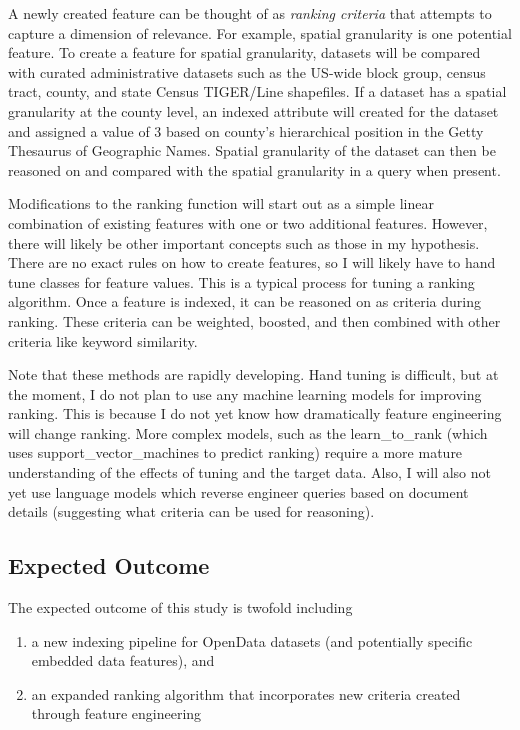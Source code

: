 A newly created feature can be thought of as \emph{ranking criteria} that attempts to capture a dimension of relevance. For example, spatial granularity is one potential feature. To create a feature for spatial granularity, datasets will be compared with curated administrative datasets such as the US-wide block group, census tract, county, and state Census TIGER/Line shapefiles. If a dataset has a spatial granularity at the county level, an indexed attribute will created for the dataset and assigned a value of 3 based on county's hierarchical position in the Getty Thesaurus of Geographic Names. Spatial granularity of the dataset can then be reasoned on and compared with the spatial granularity in a query when present.


Modifications to the ranking function will start out as a simple linear combination of existing features with one or two additional features. However, there will likely be other important concepts such as those in my hypothesis. There are no exact rules on how to create features, so I will likely have to hand tune classes for feature values. This is a typical process for tuning a ranking algorithm. Once a feature is indexed, it can be reasoned on as criteria during ranking. These criteria can be weighted, boosted, and then combined with other criteria like keyword similarity.

Note that these methods are rapidly developing. Hand tuning is difficult, but at the moment, I do not plan to use any machine learning models for improving ranking. This is because I do not yet know how dramatically feature engineering will change ranking. More complex models, such as the \gls{learn_to_rank} (which uses \gls{support_vector_machines} to predict ranking) require a more mature understanding of the effects of tuning and the target data. Also, I will also not yet use language models which reverse engineer queries based on document details (suggesting what criteria can be used for reasoning).

\subsection{Expected Outcome}
The expected outcome of this study is twofold including
\begin{enumerate}
    \item a new indexing pipeline for OpenData datasets (and potentially specific embedded data features), and 
    \item an expanded ranking algorithm that incorporates new criteria created through feature engineering
\end{enumerate}

